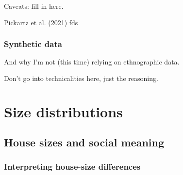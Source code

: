 \documentclass[
  12pt,
]{book}
\begin{document}
Caveats: fill in here.

Pickartz et al. (2021) fds

\hypertarget{synthetic-data}{%
\section{Synthetic data}\label{synthetic-data}}

And why I'm not (this time) relying on ethnographic data.

Don't go into technicalities here, just the reasoning.

\hypertarget{part-size-distributions}{%
\part{Size distributions}\label{part-size-distributions}}

\hypertarget{house-sizes-theory}{%
\chapter{House sizes and social meaning}\label{house-sizes-theory}}

\hypertarget{house-sizes-ethno}{%
\section{Interpreting house-size differences}\label{house-sizes-ethno}}
\end{document}
